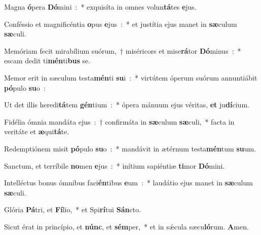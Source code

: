 ﻿\item Magna \textbf{ó}\-pera \textbf{Dó}\-mini~:~* exquisíta in omnes vo\-lun\-\textbf{tá}\-tes \textbf{e}jus.
\item Conféssio et magnificéntia \textbf{o}\-pus \textbf{e}jus~:~* et justítia ejus manet in \textbf{sæ}\-culum \textbf{sæ}culi.
\item Memóriam fecit mirabílium suórum,~† miséricors et mise\textbf{rá}\-tor \textbf{Dó}\-minus~:~* escam dedit ti\textbf{mén}\-ti\textbf{bus} se.
\item Memor erit in sæculum testa\textbf{mén}\-ti \textbf{su}\-i~:~* virtútem óperum suórum annuntiábit \textbf{pó}\-pulo \textbf{su}o~:
\item Ut det illis heredi\textbf{tá}\-tem \textbf{gén}\-tium~:~* ópera mánuum ejus véritas, \textbf{et} ju\textbf{dí}cium.
\item Fidélia ómnia mandáta ejus~:~† confirmáta in \textbf{sæ}\-cu\-lum \textbf{sæ}\-culi,~* facta in veritáte et \textbf{æ}qui\textbf{tá}te.
\item Redemptiónem misit \textbf{pó}\-pulo \textbf{su}\-o~:~* mandávit in ætérnum testa\textbf{mén}\-tum \textbf{su}um.
\item Sanctum, et terríbile \textbf{no}\-men \textbf{e}jus~:~* inítium sapiéntiæ \textbf{ti}\-mor \textbf{Dó}mini.
\item Intelléctus bonus ómnibus faci\textbf{én}\-tibus \textbf{e}\-um~:~* laudátio ejus manet in \textbf{sæ}\-culum \textbf{sæ}culi.
\item Glória \textbf{Pá}\-tri, et \textbf{Fí}\-lio,~* et Spi\textbf{rí}\-tui \textbf{Sán}cto.
\item Sicut érat in princípio, et \textbf{núnc}, et \textbf{sém}\-per,~* et in sǽcula sæcu\textbf{ló}\-rum. \textbf{A}men.